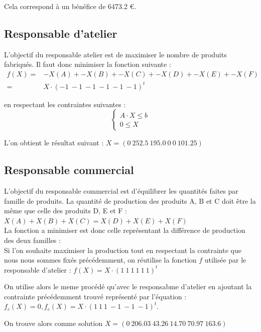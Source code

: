\documentclass[a4paper, 11pt]{article}
\begin{document}
Cela correspond à un bénéfice de 6473.2 €.

\subsection{Responsable d'atelier}
L'objectif du responsable atelier est de maximiser le nombre de produits fabriqués.
Il faut donc minimiser la fonction suivante : \\
$$
\begin{array}{rl}
    f(X) = & -X(A) + -X(B) + -X(C) + -X(D) + -X(E) + -X(F) \\
    = & X\cdot(-1~-1~-1~-1~-1~-1)^t
\end{array}
$$

en respectant les contraintes suivantes : \\
$$
\left\{\begin{split}
    A\cdot X \leq b\\ 
    0 \leq X
\end{split}\right.
$$

L'on obtient le résultat suivant : $ X = (0~252.5~195.0~0~0~101.25) $ \\

\subsection{Responsable commercial}
L'objectif du responsable commercial est d'équilibrer les quantités faites par famille de produits.
La quantité de production des produits A, B et C doit être la même que celle des produits D, E et F : \\
$X(A) + X(B) + X(C) = X(D) + X(E) + X(F)$ \\

La fonction a minimiser est donc celle représentant la différence de production des deux familles : \\
Si l’on souhaite maximiser la production tout en respectant la contrainte que nous
nous sommes fixés précédemment, on réutilise la fonction $f$ utilisée par le
responsable d’atelier : $ f(X) = X\cdot(1~1~1~1~1~1)^t $

On utilise alors le meme procédé qu'avec le responsabme d'atelier en ajoutant
la contrainte précédemment trouvé représenté par l'équation : \\
$ f_c(X) = 0, f_c(X) = X\cdot(1~1~1~-1~-1~-1)^t $.

On trouve alors comme solution $X = (0~206.03~43.26~14.70~70.97~163.6) $ \\
\end{document}
